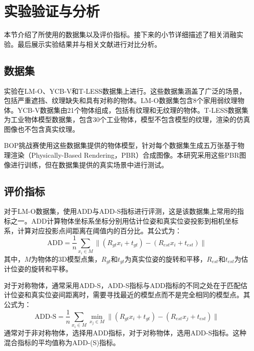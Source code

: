 \section{实验验证与分析}\label{sec:exp}

本节介绍了所使用的数据集以及评价指标。接下来的小节详细描述了相关消融实验。最后展示实验结果并与相关文献进行对比分析。

\subsection{数据集}
实验在LM-O\cite{lmo}、YCB-V\cite{ycbv}和T-LESS\cite{tless}数据集上进行。这些数据集涵盖了广泛的场景，包括严重遮挡、纹理缺失和具有对称的物体。LM-O数据集包含8个家用弱纹理物体。YCB-V数据集由21个物体组成，包括有纹理和无纹理的物体。T-LESS数据集为工业物体模型数据集，包含30个工业物体，模型不包含模型的纹理，渲染的仿真图像也不包含真实纹理。

BOP挑战赛\cite{Sundermeyer2023BOPC2}使用这些数据集提供的物体模型，针对每个数据集生成五万张基于物理渲染（Physically-Based Rendering，PBR）合成图像。本研究采用这些PBR图像进行训练，但在数据集提供的真实场景中进行测试。

\subsection{评价指标}\label{subsec:评价指标}

\par 对于LM-O数据集，使用ADD与ADD-S指标进行评测，这是该数据集上常用的指标之一。ADD计算物体坐标系坐标分别用估计位姿和真实位姿投影到相机坐标系，计算对应投影点间距离在阈值内的百分比。其公式为：
\begin{equation}
  \text{ADD} = \frac{1}{n}\sum_{x_i \in M} \| (R_{gt}x_i + t_{gt}) - (R_{est}x_i + t_{est}) \|
\end{equation}
其中，$M$为物体的3D模型点集，$R_{gt}$和$t_{gt}$为真实位姿的旋转和平移，$R_{est}$和$t_{est}$为估计位姿的旋转和平移。

\par 对于对称物体，通常采用ADD-S，ADD-S指标与ADD指标的不同之处在于匹配估计位姿和真实位姿间距离时，需要寻找最近的模型点而不是完全相同的模型点。其公式为：
\begin{equation}
  \text{ADD-S} = \frac{1}{n}\sum_{x_i \in M} \min\limits_{x_j \in M} \| (R_{gt}x_i + t_{gt}) - (R_{est}x_j + t_{est}) \|
\end{equation}
通常对于非对称物体，选择用ADD指标，对于对称物体，选用ADD-S指标。这种混合指标的平均值称为ADD-(S)指标。

